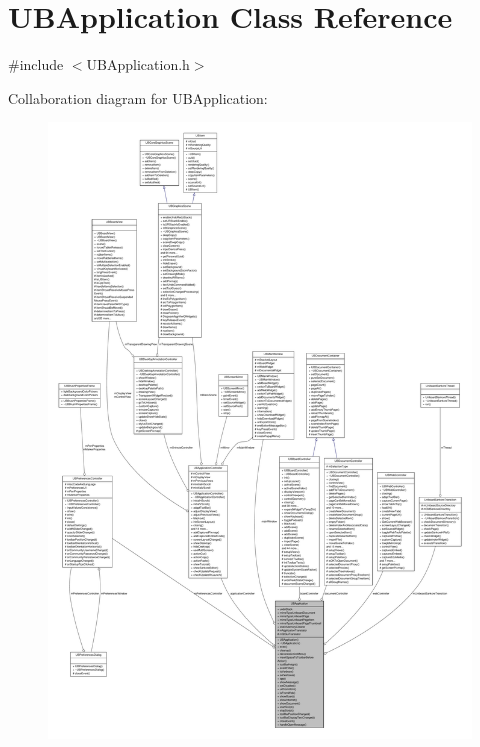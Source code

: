 \hypertarget{class_u_b_application}{\section{U\-B\-Application Class Reference}
\label{d8/d81/class_u_b_application}
}


{\ttfamily \#include $<$U\-B\-Application.\-h$>$}



Collaboration diagram for U\-B\-Application\-:
\nopagebreak
\begin{figure}[H]
\begin{center}
\leavevmode
\includegraphics[width=350pt]{df/d1c/class_u_b_application__coll__graph}
\end{center}
\end{figure}
